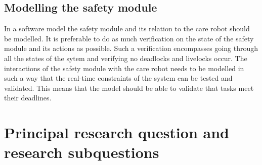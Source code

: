 \documentclass[12pt]{scrreprt}
\begin{document}

\subsection{Modelling the safety module}
\label{Modelling the safety module}
In a software model the safety module and its relation to the care robot should be modelled. It is preferable to do as much verification on the state of the safety module and its actions as possible. Such a verification encompasses going through all the states of the sytem and verifying no deadlocks and livelocks occur.
The interactions of the safety module with the care robot needs to be modelled in such a way that the real-time constraints of the system can be tested and validated. This means that the model should be able to validate that tasks meet their deadlines.
\par



\section{Principal research question and research subquestions}
\label{Principal research question and research subquestions}
\end{document}
